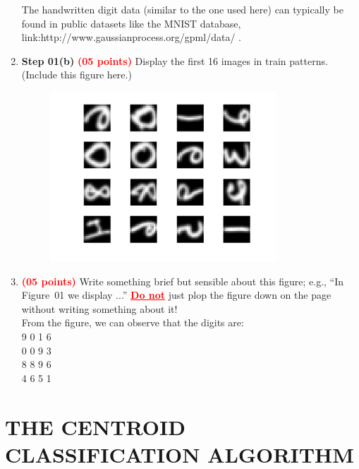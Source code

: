 \documentclass[dvipsnames,12pt]{article} %
\newcommand{\Brd}[1]{{\textbf{\textcolor{Red}{#1}}}}               %
\begin{document}
\begin{enumerate}[label=\textbf{(\alph*}), leftmargin=48pt]
          The handwritten digit data (similar to the one used here) can typically be found in public datasets like the MNIST database, link:http://www.gaussianprocess.org/gpml/data/ .

      \vspace{06pt}

      \item \textbf{Step 01(b)} \Brd{(05 points)} Display the first 16 images in train patterns.
        (Include this figure here.)
        \begin{figure}[H]
          \centering
          \includegraphics[width=0.8\textwidth]{digit_images.png}
          \label{fig:music}
        \end{figure}
      \vspace{06pt}

      \item \Brd{(05 points)} Write something brief but sensible about this figure; e.g., ``In
        Figure~01 we display ...''
        \Brd{\underline{Do not}} just plop the figure down on the page without writing something
         about it!\\
 From the figure, we can observe that the digits are: \\
        9 0 1 6\\
        0 0 9 3\\
        8 8 9 6\\
        4 6 5 1\\
    \end{enumerate}

  \section{THE CENTROID CLASSIFICATION ALGORITHM}
    \label{SECT 03:THE CENTROID ALGORITHM}
\end{document}
